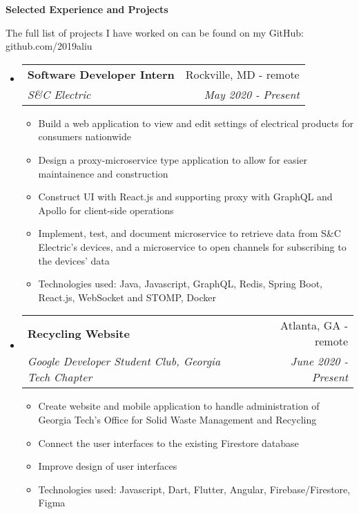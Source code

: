 \documentclass[letterpaper,10pt]{article}
\makeatletter
\newcommand{\resitem}[1]{\item #1 \vspace{-2pt}}
\newcommand{\resheading}[1]{{\large \colorbox{mygrey}{\begin{minipage}{\textwidth}{\textbf{#1 \vphantom{p\^{E}}}}\end{minipage}}}}
\newcommand{\ressubheading}[4]{
\begin{tabular*}{7.0in}{l@{\extracolsep{\fill}}r}
		\textbf{#1} & #2 \\
		\textit{#3} & \textit{#4} \\
\end{tabular*}\vspace{-6pt}}
\makeatother
\begin{document}
\resheading{Selected Experience and Projects}

\vspace{1em}
The full list of projects I have worked on can be found on my GitHub: github.com/2019aliu

\begin{itemize}
\item
    \ressubheading{Software Developer Intern}{Rockville, MD - remote}{S\&C Electric}{May 2020 - Present}
    \begin{itemize}
        \resitem{Build a web application to view and edit settings of electrical products for consumers nationwide}
        \resitem{Design a proxy-microservice type application to allow for easier maintainence and construction}
        \resitem{Construct UI with React.js and supporting proxy with GraphQL and Apollo for client-side operations}
        \resitem{Implement, test, and document microservice to retrieve data from S\&C Electric's devices, and a microservice to open channels for subscribing to the devices' data}
        \resitem{Technologies used: Java, Javascript, GraphQL, Redis, Spring Boot, React.js, WebSocket and STOMP, Docker}
    \end{itemize}
\item
    \ressubheading{Recycling Website}{Atlanta, GA - remote}{Google Developer Student Club, Georgia Tech Chapter}{June 2020 - Present}
    \begin{itemize}
        \resitem{Create website and mobile application to handle administration of Georgia Tech's Office for Solid Waste Management and Recycling}
        \resitem{Connect the user interfaces to the existing Firestore database}
        \resitem{Improve design of user interfaces}
        \resitem{Technologies used: Javascript, Dart, Flutter, Angular, Firebase/Firestore, Figma}
    \end{itemize}

\end{itemize}
\end{document}
